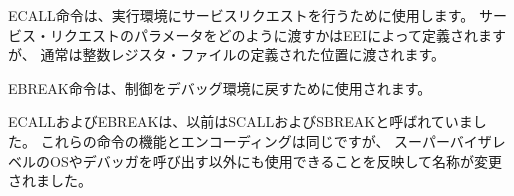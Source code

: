 ECALL命令は、実行環境にサービスリクエストを行うために使用します。 
サービス・リクエストのパラメータをどのように渡すかはEEIによって定義されますが、
通常は整数レジスタ・ファイルの定義された位置に渡されます。

\begin{comment}
The EBREAK instruction is used to return control to a debugging
environment.
\end{comment}

EBREAK命令は、制御をデバッグ環境に戻すために使用されます。

\begin{commentary}
\begin{comment}
ECALL and EBREAK were previously named SCALL and SBREAK.  The
instructions have the same functionality and encoding, but were
renamed to reflect that they can be used more generally than to call a
supervisor-level operating system or debugger.
\end{comment}
ECALLおよびEBREAKは、以前はSCALLおよびSBREAKと呼ばれていました。 
これらの命令の機能とエンコーディングは同じですが、
スーパーバイザレベルのOSやデバッガを呼び出す以外にも使用できることを反映して名称が変更されました。
\end{commentary}

